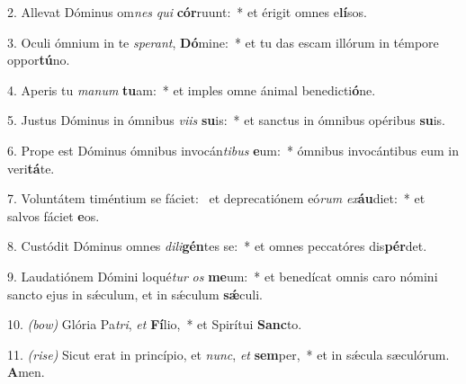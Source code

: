2. Allevat Dóminus om\textit{nes} \textit{qui} \textbf{cór}ruunt:~* et érigit omnes e\textbf{lí}sos.

3. Oculi ómnium in te \textit{spe}\textit{rant}, \textbf{Dó}mine:~* et tu das escam illórum in témpore oppor\textbf{tú}no.

4. Aperis tu \textit{ma}\textit{num} \textbf{tu}am:~* et imples omne ánimal benedicti\textbf{ó}ne.

5. Justus Dóminus in ómnibus \textit{vi}\textit{is} \textbf{su}is:~* et sanctus in ómnibus opéribus \textbf{su}is.

6. Prope est Dóminus ómnibus invocán\textit{ti}\textit{bus} \textbf{e}um:~* ómnibus invocántibus eum in veri\textbf{tá}te.

7. Voluntátem timéntium se fáciet:~{\color{red}\GreDagger} et deprecatiónem eó\textit{rum} \textit{ex}\textbf{áu}diet:~* et salvos fáciet \textbf{e}os.

8. Custódit Dóminus omnes \textit{di}\textit{li}\textbf{gén}tes se:~* et omnes peccatóres dis\textbf{pér}det.

9. Laudatiónem Dómini loqué\textit{tur} \textit{os} \textbf{me}um:~* et benedícat omnis caro nómini sancto ejus in s\'{\ae}culum, et in s\'{\ae}culum \textbf{s\'{\ae}}culi.

10. {\color{red}\textit{(bow)}} Glória Pa\textit{tri}, \textit{et} \textbf{Fí}lio,~* et Spirítui \textbf{Sanc}to.

11. {\color{red}\textit{(rise)}} Sicut erat in princípio, et \textit{nunc}, \textit{et} \textbf{sem}per,~* et in s\'{\ae}cula sæculórum. \textbf{A}men.

